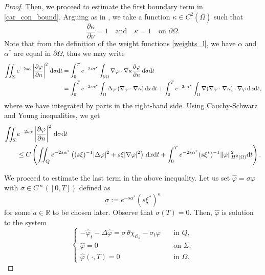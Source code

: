 \documentclass[preprint,10pt]{article}
\numberwithin{equation}{section}
\numberwithin{theorem}{section}
\def\dx{\,\textnormal{d}x}
\def\dt{\textnormal{d}t}
\def\d{\,\textnormal{d}}
\def\dx{\,\textnormal{d}x}
\def\dt{\textnormal{d}t}
\def\d{\,\textnormal{d}}
\begin{document}
{\begin{proof}
Then, we proceed to estimate the first boundary term in \eqref{car_con_bound}. Arguing as in \cite{duprez_lissy}, we take a function $\kappa\in C^2(\overline \Omega)$ such that
%
\begin{equation*}
\frac{\partial \kappa}{\partial \nu}=1 \quad\text{and}\quad \kappa=1 \quad \text{on } \partial \Omega.
\end{equation*}
%
Note that from the definition of the weight functions \eqref{weights_l}, we have $\alpha$ and $\alpha^*$ are equal in $\partial \Omega$, thus we may write
%
\begin{equation*}
\begin{split}
\iint_{\Sigma}e^{-2s\alpha}\left|\frac{\partial \varphi}{\partial n}\right|^2\d\sigma\dt&=\int_{0}^{T}e^{-2s\alpha^*}\int_{\partial \Omega}\nabla\varphi\cdot \nabla \kappa\frac{\partial \varphi}{\partial n} \d\sigma \dt\\
&=\int_{0}^{T}e^{-2s\alpha^*}\int_{\Omega}\Delta \varphi\,(\nabla\varphi\cdot \nabla \kappa)\dx\dt+\int_{0}^Te^{-2s\alpha^*}\int_\Omega\nabla (\nabla\varphi\cdot\nabla\kappa)\cdot\nabla \varphi \dx\dt,
\end{split}
\end{equation*}
%
where we have integrated by parts in the right-hand side. Using Cauchy-Schwarz and Young inequalities, we get
%
\begin{equation}\label{estimate_1}
\begin{split}
\iint_{\Sigma}&e^{-2s\alpha}\left|\frac{\partial \varphi}{\partial n}\right|^2\d\sigma \dt\\
&\leq C\left(\iint_Q e^{-2s\alpha^*}\left((s\xi)^{-1}|\Delta \varphi|^2 + s\xi|\nabla \varphi|^2\right)\dx\dt+\int_{0}^{T}e^{-2s\alpha^*}(s\xi^*)^{-1}\|\varphi\|^2_{H^2(\Omega)}\dt\right).
\end{split}
\end{equation}

We proceed to estimate the last term in the above inequality. Let us set $\widehat \varphi=\sigma\varphi$ with $\sigma\in C^\infty([0,T])$ defined as
%
\begin{equation}\label{rho_def}
\sigma:=e^{-s\alpha^*}(s\xi^*)^a
\end{equation}
%
for some $a\in \mathbb R$ to be chosen later. Observe that $\sigma(T)=0$. Then, $\widehat{\varphi}$ is solution to the system
%
\begin{equation}\label{phi_gorro}
\begin{cases}
-\widehat\varphi_t-\Delta \widehat\varphi=\sigma\,\theta\chi_{\mathcal O_d}-\sigma_t\varphi \quad& \text{in } Q, \\
\widehat\varphi=0 \quad& \text{on } \Sigma, \\
\widehat{\varphi}(\cdot,T)=0 \quad&\text{in } \Omega.
\end{cases}
\end{equation}


\end{proof}}
\end{document}
